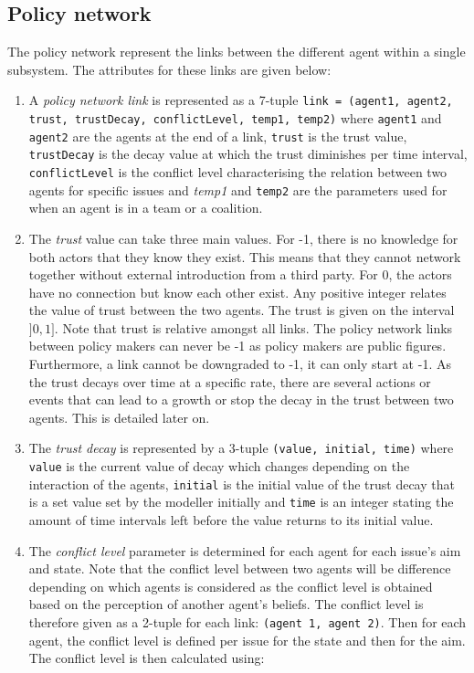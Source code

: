 \subsection{Policy network}

The policy network represent the links between the different agent within a single subsystem. The attributes for these links are given below:

\begin{enumerate}
\item A \emph{policy network link} is represented as a 7-tuple \texttt{link = (agent1, agent2, trust, trustDecay, conflictLevel, temp1, temp2)} where \texttt{agent1} and \texttt{agent2} are the agents at the end of a link, \texttt{trust} is the trust value, \texttt{trustDecay} is the decay value at which the trust diminishes per time interval, \texttt{conflictLevel} is the conflict level characterising the relation between two agents for specific issues and \emph{temp1} and \texttt{temp2} are the parameters used for when an agent is in a team or a coalition.

\item The \emph{trust} value can take three main values. For -1, there is no knowledge for both actors that they know they exist. This means that they cannot network together without external introduction from a third party. For 0, the actors have no connection but know each other exist. Any positive integer relates the value of trust between the two agents. The trust is given on the interval $]0,1]$. Note that trust is relative amongst all links. The policy network links between policy makers can never be -1 as policy makers are public figures. Furthermore, a link cannot be downgraded to -1, it can only start at -1. As the trust decays over time at a specific rate, there are several actions or events that can lead to a growth or stop the decay in the trust between two agents. This is detailed later on.

\item The \emph{trust decay} is represented by a 3-tuple \texttt{(value, initial, time)} where \texttt{value} is the current value of decay which changes depending on the interaction of the agents, \texttt{initial} is the initial value of the trust decay that is a set value set by the modeller initially and \texttt{time} is an integer stating the amount of time intervals left before the value returns to its initial value.

\item The \emph{conflict level} parameter is determined for each agent for each issue's aim and state. Note that the conflict level between two agents will be difference depending on which agents is considered as the conflict level is obtained based on the perception of another agent's beliefs. The conflict level is therefore given as a 2-tuple for each link: \texttt{(agent 1, agent 2)}. Then for each agent, the conflict level is defined per issue for the state and then for the aim. The conflict level is then calculated using:


\end{enumerate}
